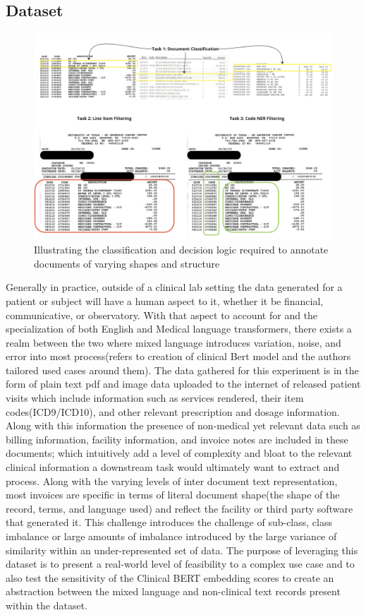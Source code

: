 \documentclass{article}
\begin{document}
\subsection{Dataset}
    \graphicspath{{Images/}}
	\begin{figure}[htp]
		\centering
		\includegraphics[scale=.3]{examples}
		\caption{Illustrating the classification and decision logic required to annotate documents of varying shapes and structure}
		\label{fig:examples}
	\end{figure}
Generally in practice, outside of a clinical lab setting the data generated for a patient or subject will have a human aspect to it, whether it be financial, communicative, or observatory. With that aspect to account for and the specialization of both English and Medical language transformers, there exists a realm between the two where mixed language introduces variation, noise, and error into most process(refers to creation of clinical Bert model and the authors tailored used cases around them). The data gathered for this experiment is in the form of plain text pdf and image data uploaded to the internet of released patient visits which include information such as services rendered, their item codes(ICD9/ICD10), and other relevant prescription and dosage information. Along with this information the presence of non-medical yet relevant data such as billing information, facility information, and invoice notes  are included in these documents; which intuitively add a level of complexity and bloat to the relevant clinical information a downstream task would ultimately want to extract and process. Along with the varying levels of inter document text representation, most invoices are specific in terms of literal document shape(the shape of the record, terms, and  language used) and reflect the facility or third party software that generated it. This challenge introduces the challenge of sub-class, class imbalance or large amounts of imbalance introduced by the large variance of similarity within an under-represented set of data. The purpose of leveraging this dataset is to present a real-world level of feasibility to a complex use case and to also test the sensitivity of the Clinical BERT embedding scores to create an abstraction between the mixed language and non-clinical text records present within the dataset. 
\end{document}
